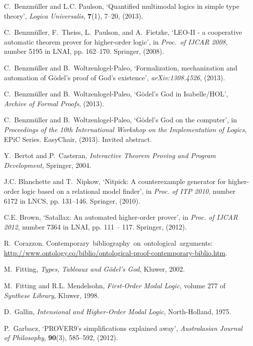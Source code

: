 \documentclass{birkjour}
\theoremstyle{definition}
\theoremstyle{remark}
\numberwithin{equation}{section}
\begin{document}
\begin{thebibliography}{1}
C.~Benzm{\"u}ller and L.C. Paulson, `Quantified multimodal logics in simple
  type theory', {\em Logica Universalis}, {\bf 7}(1),  7--20, (2013).

C.~Benzm{\"u}ller, F.~Theiss, L.~Paulson, and A.~Fietzke, `{LEO-II} - a
  cooperative automatic theorem prover for higher-order logic', in {\em
  Proc.~of IJCAR 2008}, number 5195 in LNAI, pp. 162--170. Springer, (2008).

C.~Benzm{\"u}ller and B.~Woltzenlogel-Paleo, `Formalization, mechanization and
  automation of {G{\"o}del's} proof of {God's} existence', {\em
  arXiv:1308.4526}, (2013).

C.~Benzm\"uller and B.~Woltzenlogel-Paleo, `{G{\"o}del's God in Isabelle/HOL}',
  {\em Archive of Formal Proofs}, (2013).

C.~Benzm\"uller and B.~Woltzenlogel-Paleo, `G\"odel's {God} on the computer',
  in {\em Proceedings of the 10th International Workshop on the Implementation
  of Logics}, EPiC Series. EasyChair, (2013).
\newblock Invited abstract.

Y.~Bertot and P.~Casteran, {\em {Interactive Theorem Proving and Program
  Development}}, Springer, 2004.

J.C. Blanchette and T.~Nipkow, `Nitpick: A counterexample generator for
  higher-order logic based on a relational model finder', in {\em Proc. of ITP
  2010}, number 6172 in LNCS, pp. 131--146. Springer, (2010).

C.E. Brown, `Satallax: An automated higher-order prover', in {\em Proc. of
  IJCAR 2012}, number 7364 in LNAI, pp. 111 -- 117. Springer, (2012).

R.~Corazzon.
\newblock Contemporary~bibliography~on~ontological~arguments: {\scriptsize
  \url{http://www.ontology.co/biblio/ontological-proof-contemporary-biblio.htm}}.

M.~Fitting, {\em Types, Tableaux and G\"odel's God}, Kluwer, 2002.

M.~Fitting and R.L. Mendelsohn, {\em First-Order Modal Logic}, volume 277 of
  {\em Synthese Library}, Kluwer, 1998.

D.~Gallin, {\em Intensional and Higher-Order Modal Logic}, North-Holland, 1975.

P.~Garbacz, `{PROVER9's} simplifications explained away', {\em Australasian
  Journal of Philosophy}, {\bf 90}(3),  585--592, (2012).


\end{thebibliography}
\end{document}
